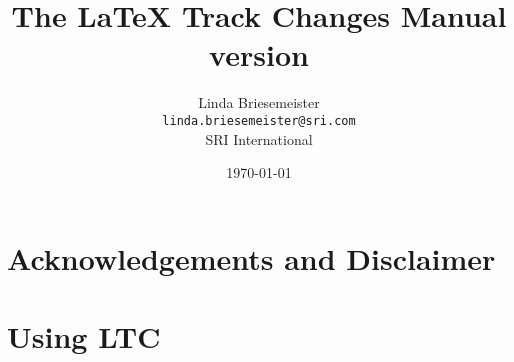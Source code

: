 \documentclass{report}
\title{The \LaTeX{} Track Changes Manual\\
{\large version }}
\author{%
Linda Briesemeister\\
\texttt{linda.briesemeister@sri.com}\\
SRI International
}
\date{\today}
\begin{document}
\maketitle

\tableofcontents

\chapter*{Acknowledgements and Disclaimer}




\chapter{Using LTC}







%


\end{document}
